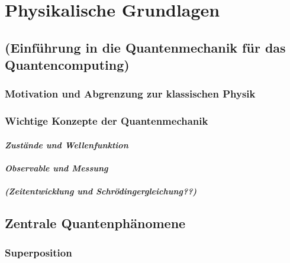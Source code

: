 \chapter{Physikalische Grundlagen}
\label{physics} %



\section{(Einführung in die Quantenmechanik für das Quantencomputing)}
\subsection{Motivation und Abgrenzung zur klassischen Physik }
\subsection{Wichtige Konzepte der Quantenmechanik }
\subsubsection{\textit{\textit{Zustände und Wellenfunktion} }}
\subsubsection{\textit{Observable und Messung}} 
\subsubsection{\textit{(Zeitentwicklung und Schrödingergleichung??)} }

\section{Zentrale Quantenphänomene }
\subsection{Superposition }

